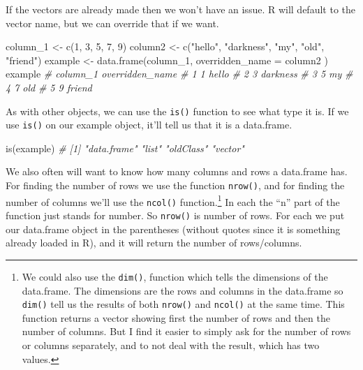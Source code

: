 \documentclass[
]{krantz}
\makeatletter
\newenvironment{Shaded}{\begin{snugshade}}{\end{snugshade}}
\newcommand{\AttributeTok}[1]{\textcolor[rgb]{0.61,0.61,0.61}{#1}}
\newcommand{\CommentTok}[1]{\textcolor[rgb]{0.37,0.37,0.37}{\textit{#1}}}
\newcommand{\DecValTok}[1]{\textcolor[rgb]{0.06,0.06,0.06}{#1}}
\newcommand{\FunctionTok}[1]{\textcolor[rgb]{0,0,0}{#1}}
\newcommand{\NormalTok}[1]{#1}
\newcommand{\OtherTok}[1]{\textcolor[rgb]{0.37,0.37,0.37}{#1}}
\newcommand{\StringTok}[1]{\textcolor[rgb]{0.5,0.5,0.5}{#1}}
\newenvironment{kframe}{%
\medskip{}
\setlength{\fboxsep}{.8em}
 \def\at@end@of@kframe{}%
 \ifinner\ifhmode%
  \def\at@end@of@kframe{\end{minipage}}%
  \begin{minipage}{\columnwidth}%
 \fi\fi%
 \def\FrameCommand##1{\hskip\@totalleftmargin \hskip-\fboxsep
 \colorbox{shadecolor}{##1}\hskip-\fboxsep
     \hskip-\linewidth \hskip-\@totalleftmargin \hskip\columnwidth}%
 \MakeFramed {\advance\hsize-\width
   \@totalleftmargin\z@ \linewidth\hsize
   \@setminipage}}%
 {\par\unskip\endMakeFramed%
 \at@end@of@kframe}
\renewenvironment{Shaded}{\begin{kframe}}{\end{kframe}}
\makeatother
\begin{document}
If the vectors are already made then we won't have an issue.
R will default to the vector name, but we can override that
if we want.

\begin{Shaded}
\begin{Highlighting}[]
\NormalTok{column\_1 }\OtherTok{\textless{}{-}} \FunctionTok{c}\NormalTok{(}\DecValTok{1}\NormalTok{, }\DecValTok{3}\NormalTok{, }\DecValTok{5}\NormalTok{, }\DecValTok{7}\NormalTok{, }\DecValTok{9}\NormalTok{)}
\NormalTok{column2 }\OtherTok{\textless{}{-}} \FunctionTok{c}\NormalTok{(}\StringTok{"hello"}\NormalTok{, }\StringTok{"darkness"}\NormalTok{, }\StringTok{"my"}\NormalTok{, }\StringTok{"old"}\NormalTok{, }\StringTok{"friend"}\NormalTok{)}
\NormalTok{example }\OtherTok{\textless{}{-}} \FunctionTok{data.frame}\NormalTok{(column\_1,}
  \AttributeTok{overridden\_name =}\NormalTok{ column2}
\NormalTok{)}
\NormalTok{example}
\CommentTok{\#   column\_1 overridden\_name}
\CommentTok{\# 1        1           hello}
\CommentTok{\# 2        3        darkness}
\CommentTok{\# 3        5              my}
\CommentTok{\# 4        7             old}
\CommentTok{\# 5        9          friend}
\end{Highlighting}
\end{Shaded}

As with other objects, we can use the \texttt{is()} function
to see what type it is. If we use \texttt{is()} on our
example object, it'll tell us that it is a data.frame.

\begin{Shaded}
\begin{Highlighting}[]
\FunctionTok{is}\NormalTok{(example)}
\CommentTok{\# [1] "data.frame" "list"       "oldClass"   "vector"}
\end{Highlighting}
\end{Shaded}

We also often will want to know how many columns and rows a
data.frame has. For finding the number of rows we use the
function \texttt{nrow()}, and for finding the number of
columns we'll use the \texttt{ncol()} function.\footnote{We
  could also use the \texttt{dim()}, function which tells
  the dimensions of the data.frame. The dimensions are the
  rows and columns in the data.frame so \texttt{dim()} tell
  us the results of both \texttt{nrow()} and \texttt{ncol()}
  at the same time. This function returns a vector showing
  first the number of rows and then the number of columns.
  But I find it easier to simply ask for the number of rows
  or columns separately, and to not deal with the result,
  which has two values.} In each the ``n'' part of the
function just stands for number. So \texttt{nrow()} is
number of rows. For each we put our data.frame object in the
parentheses (without quotes since it is something already
loaded in R), and it will return the number of rows/columns.
\end{document}
